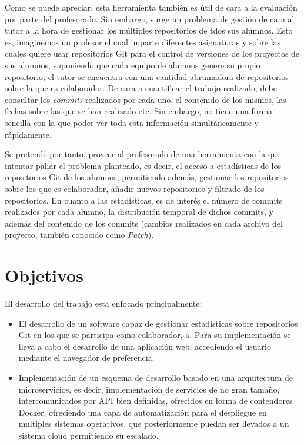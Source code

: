 Como se puede apreciar, esta herramienta también es útil de cara a la
evaluación por parte del profesorado. Sin embargo, surge un problema de
gestión de cara al tutor a la hora de gestionar los múltiples repositorios
de tdos sus alumnos. Esto es, imaginemos un profesor el cual imparte
diferentes asignaturas y sobre las cuales quiere usar repositorios Git para
el control de versiones de los proyectos de sus alumnos, suponiendo que
cada equipo de alumnos genere su propio repositorio, el tutor se encuentra
con una cantidad abrumadora de repositorios sobre la que es colaborador. De
cara a cuantificar el trabajo realizado, debe consultar los \emph{commits}
realizados por cada uno, el contenido de los mismos, las fechas sobre las
que se han realizado etc. Sin embargo, no tiene una forma sencilla con la
que poder ver toda esta información simultáneamente y rápidamente.

Se pretende por tanto, proveer al profesorado de una herramienta con la que
intentar paliar el problema planteado, es decir, el acceso a estadísticas
de los repositorios Git de los alumnos, permitiendo además, gestionar los
repositorios sobre los que es colaborador, añadir nuevos repositorios y
filtrado de los repositorios. En cuanto a las estadísticas, es de interés
el número de commits realizados por cada alumno, la distribución temporal
de dichos commits, y además del contenido de los commits (cambios
realizados en cada archivo del proyecto, también conocido como
\textit{Patch}).

\section{Objetivos}

El desarrollo del trabajo esta enfocado principalmente:

\begin{itemize}

\item El desarrollo de un software capaz de gestionar estadísticas sobre
  repositorios Git en los que se participa como colaborador, a. Para su
  implementación se lleva a cabo el desarrollo de una aplicación web,
  accediendo el usuario mediante el navegador de preferencia.

\item Implementación de un esquema de desarrollo basado en una arquitectura
  de microservicios, es decir, implementación de servicios de no gran
  tamaño, intercomunicados por API bien definidas, ofrecidos en forma de
  contendores Docker, ofreciendo una capa de automatización para el
  despliegue en multiples sistemas operativos, que posteriormente puedan
  ser llevados a un sistema cloud permitiendo su escalado.
\end{itemize}


